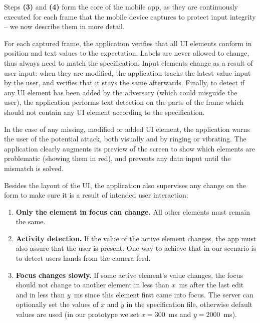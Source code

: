 Steps \textbf{(3)} and \textbf{(4)} form the core of the \name mobile app, as they are continuously executed for each frame that the mobile device captures to protect input integrity -- we now describe them in more detail.


For each captured frame, the application verifies that all UI elements conform in position and text values to the expectation.
Labels are never allowed to change, thus always need to match the specification.
Input elements change as a result of user input: when they are modified, the application tracks the latest value input by the user, and verifies that it stays the same afterwards.
Finally, to detect if any UI element has been added by the adversary (which could misguide the user), the application performs text detection on the parts of the frame which should not contain any UI element according to the specification.

In the case of any missing, modified or added UI element, the application warns the user of the potential attack, both visually and by ringing or vibrating.
The application clearly augments its preview of the screen to show which elements are problematic (showing them in red), and prevents any data input until the mismatch is solved.



Besides the layout of the UI, the application also supervises any change on the form to make sure it is a result of intended user interaction:

\begin{enumerate} [label=(\alph*), leftmargin=*]
    \item \textbf{Only the element in focus can change.}
    All other elements must remain the same.
    \item \textbf{Activity detection.}
    If the value of the active element changes, the app must also assure that the user is present. One way to achieve that in our scenario is to detect users hands from the camera feed.
    \item \textbf{Focus changes slowly.}
    If some active element's value changes, the focus should not change to another element in less than $x$~ms after the last edit and in less than $y$~ms since this element first came into focus.
    The server can optionally set the values of $x$ and $y$ in the specification file, otherwise default values are used (in our prototype we set $x=300$~ms and $y=2000$~ms).


\end{enumerate}


